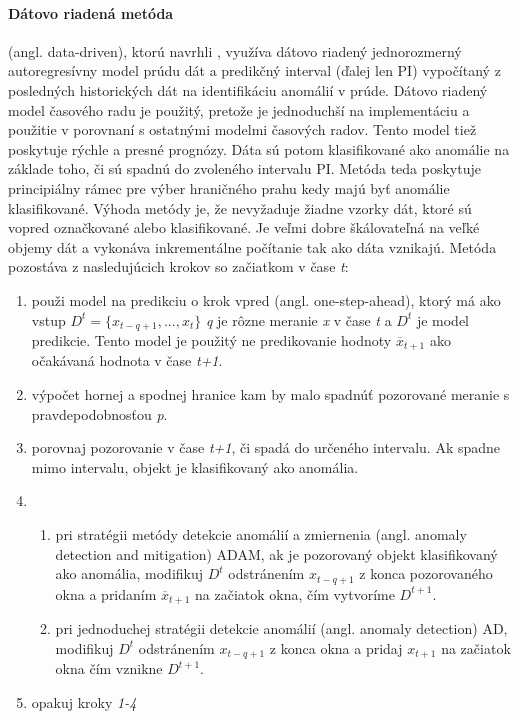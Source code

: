 \paragraph{Dátovo riadená metóda} (angl. data-driven), ktorú navrhli \citep{hill2010anomaly}, využíva dátovo riadený jednorozmerný autoregresívny model prúdu dát a predikčný interval (ďalej len PI) vypočítaný z posledných historických dát na identifikáciu anomálií v prúde. Dátovo riadený model časového radu je použitý, pretože je jednoduchší na implementáciu a použitie v porovnaní s ostatnými modelmi časových radov. Tento model tiež poskytuje rýchle a presné prognózy. Dáta sú potom klasifikované ako anomálie na základe toho, či sú spadnú do zvoleného intervalu PI. Metóda teda poskytuje principiálny rámec pre výber hraničného prahu kedy majú byť anomálie klasifikované. Výhoda metódy je, že nevyžaduje žiadne vzorky dát, ktoré sú vopred označkované alebo klasifikované. Je veľmi dobre škálovateľná na veľké objemy dát a vykonáva inkrementálne počítanie tak ako dáta vznikajú.
Metóda pozostáva z nasledujúcich krokov so začiatkom v čase \textit{t}:
\begin{enumerate}
	\item použi model na predikciu o krok vpred (angl. one-step-ahead), ktorý má ako vstup $\displaystyle D^t = \{x_{t-q+1}, ..., x_t\}$ \textit{q} je rôzne meranie \textit{x} v čase \textit{t} a $\displaystyle D^t$ je model predikcie. Tento model je použitý ne predikovanie hodnoty $\displaystyle \overline{x}_{t+1}$ ako očakávaná hodnota v čase \textit{t+1}.
	\item výpočet hornej a spodnej hranice kam by malo spadnúť pozorované meranie s pravdepodobnosťou \textit{p}.
	\item porovnaj pozorovanie v čase \textit{t+1}, či spadá do určeného intervalu. Ak spadne mimo intervalu, objekt je klasifikovaný ako anomália.
	\item 
		\begin{enumerate}
			\item pri stratégii metódy detekcie anomálií a zmiernenia (angl. anomaly detection and mitigation) ADAM, ak je pozorovaný objekt klasifikovaný ako anomália, modifikuj $\displaystyle D^t$ odstránením $\displaystyle x_{t-q+1}$ z konca pozorovaného okna a pridaním $\displaystyle \overline{x}_{t+1}$ na začiatok okna, čím vytvoríme $\displaystyle D^{t+1}$.
			\item pri jednoduchej stratégii detekcie anomálií (angl. anomaly detection) AD, modifikuj $\displaystyle D^t$  odstránením $\displaystyle x_{t-q+1}$ z konca okna a pridaj $\displaystyle x_{t+1}$ na začiatok okna čím vznikne $\displaystyle D^{t+1}$.
		\end{enumerate}
	\item opakuj kroky \textit{1-4}
\end{enumerate}
